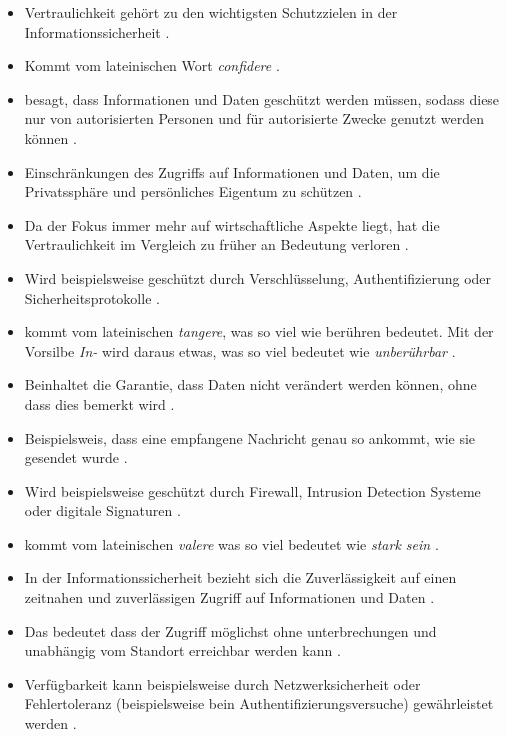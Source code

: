 \begin{itemize}
    \item Vertraulichkeit gehört zu den wichtigsten Schutzzielen in der Informationssicherheit \cite{samonas2014cia}.
    \item Kommt vom lateinischen Wort \textit{confidere} \cite{samonas2014cia}.
    \item besagt, dass Informationen und Daten geschützt werden müssen, sodass diese nur von autorisierten Personen und für autorisierte Zwecke genutzt werden können \cite{samonas2014cia}.
    \item Einschränkungen des Zugriffs auf Informationen und Daten, um die Privatssphäre und persönliches Eigentum zu schützen \cite{samonas2014cia}.
    \item Da der Fokus immer mehr auf wirtschaftliche Aspekte liegt, hat die Vertraulichkeit im Vergleich zu früher an Bedeutung verloren \cite{samonas2014cia}.
    \item Wird beispielsweise geschützt durch Verschlüsselung, Authentifizierung oder Sicherheitsprotokolle \cite{agarwal2011security}.
    \item kommt vom lateinischen \textit{tangere}, was so viel wie berühren bedeutet. Mit der Vorsilbe \textit{In-} wird daraus etwas, was so viel bedeutet wie \textit{unberührbar} \cite{samonas2014cia}.
    \item Beinhaltet die Garantie, dass Daten nicht verändert werden können, ohne dass dies bemerkt wird \cite{agarwal2011security}.
    \item Beispielsweis, dass eine empfangene Nachricht genau so ankommt, wie sie gesendet wurde \cite{agarwal2011security}.
    \item Wird beispielsweise geschützt durch Firewall, Intrusion Detection Systeme oder digitale Signaturen \cite{agarwal2011security}.
    \item kommt vom lateinischen \textit{valere} was so viel bedeutet wie \textit{stark sein} \cite{samonas2014cia}.
    \item In der Informationssicherheit bezieht sich die Zuverlässigkeit auf einen zeitnahen und zuverlässigen Zugriff auf Informationen und Daten \cite{samonas2014cia}.
    \item Das bedeutet dass der Zugriff möglichst ohne unterbrechungen und unabhängig vom Standort erreichbar werden kann \cite{agarwal2011security}. 
    \item Verfügbarkeit kann beispielsweise durch Netzwerksicherheit oder Fehlertoleranz (beispielsweise bein Authentifizierungsversuche) gewährleistet werden \cite{agarwal2011security}.
\end{itemize}

